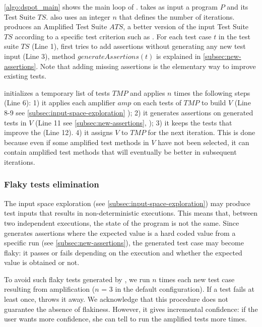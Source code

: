 \autoref{algo:dspot_main} shows the main loop of \dspot. 
\dspot takes as input a program $P$ and its Test Suite $TS$. \dspot also uses an integer $n$ that defines the number of iterations.
\dspot produces an Amplified Test Suite $ATS$, \ie a better version of the input Test Suite $TS$ according to a specific test criterion such as \ms.
For each test case $t$ in the test suite $TS$ (Line 1), \dspot first tries to add assertions without generating any new test input (Line 3),  method $generateAssertions\left(t\right)$ is explained in \autoref{subsec:new-assertions}.
Note that adding missing assertions is the elementary way to improve existing tests.

\dspot initializes a temporary list of tests $TMP$ and applies $n$ times the following steps (Line 6): 
1) it applies each amplifier $amp$ on each tests of $TMP$ to build $V$ (Line 8-9 see \autoref{subsec:input-space-exploration} \ie \Iampl);
2) it generates assertions on generated tests in $V$ (Line 11 see \autoref{subsec:new-assertions}, \ie \Aampl);
3) it keeps the tests that improve the \ms (Line 12).
4) it assigns $V$ to $TMP$ for the next iteration. This is done because even if some amplified test methods in $V$ have not been selected, it can contain amplified test methods that will eventually be better in subsequent iterations.


\subsubsection{Flaky tests elimination}
The input space exploration (see \autoref{subsec:input-space-exploration}) may produce test inputs that results in non-deterministic executions.
This means that, between two independent executions, the state of the program is not the same.
Since \dspot generates assertions where the expected value is a hard coded value from a specific run (see \autoref{subsec:new-assertions}), the generated test case may become flaky: it passes or fails depending on the execution and whether the expected value is obtained or not.

To avoid such flaky tests generated by \dspot, we run $n$ times each new test case resulting from amplification ($n$ = 3 in the default configuration). 
If a test fails at least once, \dspot throws it away. 
We acknowledge that this procedure does not guarantee the absence of flakiness. 
However, it gives incremental confidence: if the user wants more confidence, she can tell \dspot to run the amplified tests more times.

